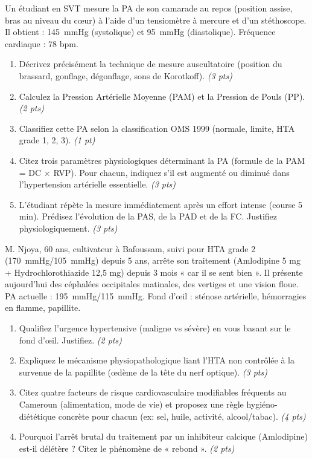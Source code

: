 \documentclass[11pt]{article}
\begin{document}
\begin{exercice}
Un étudiant en SVT mesure la PA de son camarade au repos (position assise, bras au niveau du cœur) à l'aide d'un tensiomètre à mercure et d'un stéthoscope. Il obtient : \SI{145}{\mmHg} (systolique) et \SI{95}{\mmHg} (diastolique). Fréquence cardiaque : 78 bpm.

\begin{enumerate}
    \item Décrivez précisément la technique de mesure auscultatoire (position du brassard, gonflage, dégonflage, sons de Korotkoff). \emph{(3 pts)}
    \item Calculez la Pression Artérielle Moyenne (PAM) et la Pression de Pouls (PP). \emph{(2 pts)}
    \item Classifiez cette PA selon la classification OMS 1999 (normale, limite, HTA grade 1, 2, 3). \emph{(1 pt)}
    \item Citez trois paramètres physiologiques déterminant la PA (formule de la PAM = DC $\times$ RVP). Pour chacun, indiquez s'il est augmenté ou diminué dans l'hypertension artérielle essentielle. \emph{(3 pts)}
    \item L'étudiant répète la mesure immédiatement après un effort intense (course 5 min). Prédisez l'évolution de la PAS, de la PAD et de la FC. Justifiez physiologiquement. \emph{(3 pts)}
\end{enumerate}
\end{exercice}

\begin{exercice}
M. Njoya, 60 ans, cultivateur à Bafoussam, suivi pour HTA grade 2 (\SI{170}{\mmHg}/\SI{105}{\mmHg}) depuis 5 ans, arrête son traitement (Amlodipine 5 mg + Hydrochlorothiazide 12,5 mg) depuis 3 mois « car il se sent bien ». Il présente aujourd'hui des céphalées occipitales matinales, des vertiges et une vision floue. PA actuelle : \SI{195}{\mmHg}/\SI{115}{\mmHg}. Fond d'œil : sténose artérielle, hémorragies en flamme, papillite.

\begin{enumerate}
    \item Qualifiez l'urgence hypertensive (maligne vs sévère) en vous basant sur le fond d'œil. Justifiez. \emph{(2 pts)}
    \item Expliquez le mécanisme physiopathologique liant l'HTA non contrôlée à la survenue de la papillite (œdème de la tête du nerf optique). \emph{(3 pts)}
    \item Citez quatre facteurs de risque cardiovasculaire modifiables fréquents au Cameroun (alimentation, mode de vie) et proposez une règle hygiéno-diététique concrète pour chacun (ex: sel, huile, activité, alcool/tabac). \emph{(4 pts)}
    \item Pourquoi l'arrêt brutal du traitement par un inhibiteur calcique (Amlodipine) est-il délétère ? Citez le phénomène de « rebond ». \emph{(2 pts)}
\end{enumerate}
\end{exercice}
\end{document}

